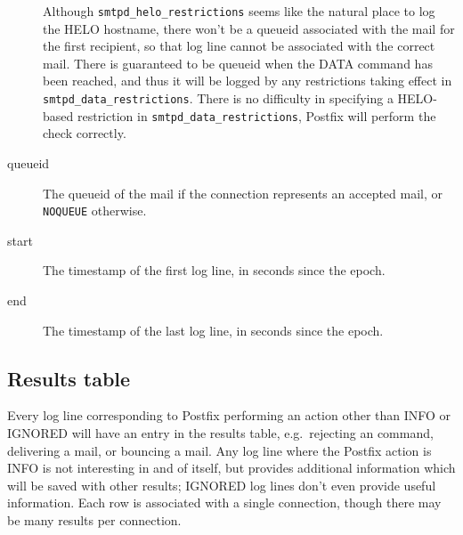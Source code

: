 \documentclass[a4paper,12pt,draft]{article}
\begin{document}
\begin{description}
\begin{enumerate}
        \end{enumerate}

        Although \texttt{smtpd\_helo\_restrictions} seems like the natural
        place to log the HELO hostname, there won't be a queueid associated
        with the mail for the first recipient, so that log line cannot be
        associated with the correct mail.  There is guaranteed to be
        queueid when the DATA command has been reached, and thus it will be
        logged by any restrictions taking effect in
        \texttt{smtpd\_data\_restrictions}.  There is no difficulty in
        specifying a HELO-based restriction in
        \texttt{smtpd\_data\_restrictions}, Postfix will perform the check
        correctly.

    \item [queueid] The queueid of the mail if the connection represents an
        accepted mail, or \texttt{NOQUEUE} otherwise.

    \item [start] The timestamp of the first log line, in seconds since the
        epoch.

    \item [end] The timestamp of the last log line, in seconds since the
        epoch.

\end{description}

\subsection{Results table}

\label{results table}

Every log line corresponding to Postfix performing an action other than
INFO or IGNORED will have an entry in the results table, e.g.\ rejecting an
\SMTP{} command, delivering a mail, or bouncing a mail.  Any log line where
the Postfix action is INFO is not interesting in and of itself, but
provides additional information which will be saved with other results;
IGNORED log lines don't even provide useful information.  Each row is
associated with a single connection, though there may be many results per
connection.
\end{document}
